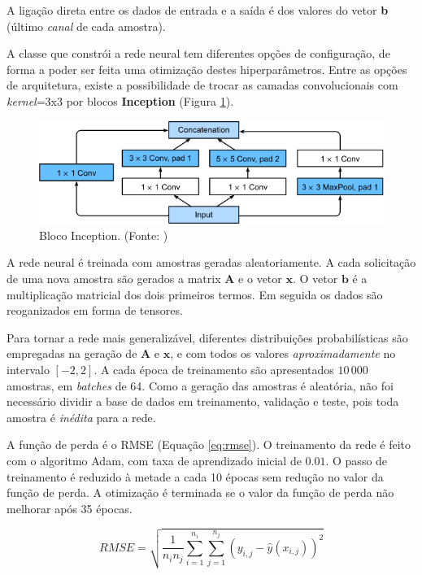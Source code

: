 \documentclass[final,5p]{elsarticle}
\numberwithin{equation}{section}
\begin{document}
    A ligação direta entre os dados de entrada e a saída é dos valores do vetor \textbf{b} (último \emph{canal} de cada amostra).

    A classe que constrói a rede neural tem diferentes opções de configuração, de forma a poder ser feita uma otimização destes hiperparâmetros. Entre as opções de arquitetura, existe a possibilidade de trocar as camadas convolucionais com \emph{kernel}=3x3 por blocos \textbf{Inception} (Figura \ref{fig:inception}).

    \begin{figure}[hbt!]
        \centering
        \includegraphics[width=0.95\columnwidth]{./fig/inception.png}
        \caption{Bloco Inception. (Fonte: \cite{zhang2021dive})}\label{fig:inception}
    \end{figure}

    A rede neural é treinada com amostras geradas aleatoriamente. A cada solicitação de uma nova amostra são gerados a matrix $\textbf{A}$ e o vetor $\textbf{x}$. O vetor $\textbf{b}$ é a multiplicação matricial dos dois primeiros termos. Em seguida os dados são reoganizados em forma de tensores.

    Para tornar a rede mais generalizável, diferentes distribuições probabilísticas são empregadas na geração de $\textbf{A}$ e $\textbf{x}$, e com todos os valores \emph{aproximadamente} no intervalo $[-2,2]$. A cada época de treinamento são apresentados $10\,000$ amostras, em \emph{batches} de 64. Como a geração das amostras é aleatória, não foi necessário dividir a base de dados em treinamento, validação e teste, pois toda amostra é \emph{inédita} para a rede.

    A função de perda é o RMSE (Equação \ref{eq:rmse}). O treinamento da rede é feito com o algoritmo Adam, com taxa de aprendizado inicial de $0.01$. O passo de treinamento é reduzido à metade a cada 10 épocas sem redução no valor da função de perda. A otimização é terminada se o valor da função de perda não melhorar após 35 épocas.

    \begin{equation}
        RMSE = \sqrt{\frac{1}{n_in_j}\sum_{i=1}^{n_i} \sum_{j=1}^{n_j} (y_{i,j} - \hat{y}(x_{i,j}))^2} \label{eq:rmse}
    \end{equation}
\end{document}
